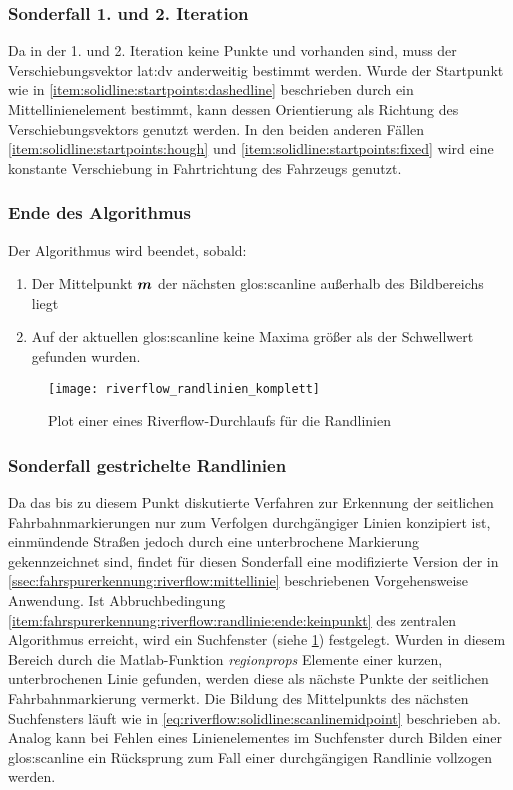 \subsubsection{Sonderfall 1. und 2. Iteration}
Da in der 1. und 2. Iteration keine Punkte  und  vorhanden sind, muss der Verschiebungsvektor \gls{lat:dv} anderweitig bestimmt werden. 
Wurde der Startpunkt wie in \ref{item:solidline:startpoints:dashedline} beschrieben durch ein Mittellinienelement bestimmt, kann dessen Orientierung als Richtung des Verschiebungsvektors genutzt werden.
In den beiden anderen Fällen \ref{item:solidline:startpoints:hough} und \ref{item:solidline:startpoints:fixed} wird eine konstante Verschiebung in Fahrtrichtung des Fahrzeugs genutzt.

\subsubsection{Ende des Algorithmus}
Der Algorithmus wird beendet, sobald:
\begin{enumerate}
\item  
Der Mittelpunkt \begin{math} \boldsymbol{m}  \end{math} der nächsten \gls{glos:scanline} außerhalb des Bildbereichs liegt
\item \label{item:fahrspurerkennung:riverflow:randlinie:ende:keinpunkt}
Auf der aktuellen \gls{glos:scanline} keine Maxima größer als der Schwellwert  gefunden wurden.
\end{enumerate}

\begin{figure}[H]
  \centering
  \texttt{[image: riverflow\_randlinien\_komplett]}
  \caption{Plot einer eines Riverflow-Durchlaufs für die Randlinien}
  \label{fig:riverflow:randlinien:plot_komplett}
\end{figure}

\subsubsection{Sonderfall gestrichelte Randlinien}
Da das bis zu diesem Punkt diskutierte Verfahren zur Erkennung der seitlichen Fahrbahnmarkierungen nur zum Verfolgen durchgängiger Linien konzipiert ist, einmündende Straßen jedoch durch eine unterbrochene Markierung gekennzeichnet sind, findet für diesen Sonderfall eine modifizierte Version der in \ref{ssec:fahrspurerkennung:riverflow:mittellinie} beschriebenen Vorgehensweise Anwendung. Ist Abbruchbedingung \ref{item:fahrspurerkennung:riverflow:randlinie:ende:keinpunkt} des zentralen Algorithmus erreicht, wird ein Suchfenster (siehe \ref{fig:riverflow:randlinien:plot_komplett}) festgelegt. Wurden in diesem Bereich durch die Matlab-Funktion \emph{regionprops} Elemente einer kurzen, unterbrochenen Linie gefunden, werden diese als nächste Punkte der seitlichen Fahrbahnmarkierung vermerkt. Die Bildung des Mittelpunkts  des nächsten Suchfensters läuft wie in \eqref{eq:riverflow:solidline:scanlinemidpoint} beschrieben ab. Analog kann bei Fehlen eines Linienelementes im Suchfenster durch Bilden einer \gls{glos:scanline} ein Rücksprung zum Fall einer durchgängigen Randlinie vollzogen werden.
